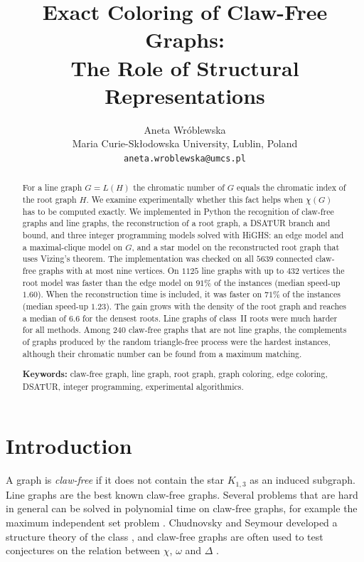 \documentclass[11pt,a4paper]{article}
\title{Exact Coloring of Claw-Free Graphs:\\ The Role of Structural Representations}
\author{Aneta Wróblewska\\[2pt]
\small Maria Curie-Sk\l{}odowska University, Lublin, Poland\\
\small \texttt{aneta.wroblewska@umcs.pl}}
\date{}
\begin{document}
\maketitle

\begin{abstract}
\noindent
For a line graph $G=L(H)$ the chromatic number of $G$ equals the chromatic
index of the root graph $H$. We examine experimentally whether this fact helps
when $\chi(G)$ has to be computed exactly. We implemented in Python the
recognition of claw-free graphs and line graphs, the reconstruction of a root
graph, a DSATUR branch and bound, and three integer programming models solved
with HiGHS: an edge model and a maximal-clique model on $G$, and a star model
on the reconstructed root graph that uses Vizing's theorem. The implementation
was checked on all $5639$ connected claw-free graphs with at most nine
vertices. On $1125$ line graphs with up to $432$ vertices the root model was
faster than the edge model on $91\%$ of the instances (median speed-up $1.60$).
When the reconstruction time is included, it was faster on $71\%$ of the
instances (median speed-up $1.23$). The gain grows with the density of the root
graph and reaches a median of $6.6$ for the densest roots. Line graphs of
class~II roots were much harder for all methods. Among $240$ claw-free graphs
that are not line graphs, the complements of graphs produced by the random
triangle-free process were the hardest instances, although their chromatic
number can be found from a maximum matching.

\medskip\noindent
\textbf{Keywords:} claw-free graph, line graph, root graph, graph coloring,
edge coloring, DSATUR, integer programming, experimental algorithmics.
\end{abstract}

\section{Introduction}

A graph is \emph{claw-free} if it does not contain the star $K_{1,3}$ as an
induced subgraph. Line graphs are the best known claw-free graphs. Several
problems that are hard in general can be solved in polynomial time on
claw-free graphs, for example the maximum independent set problem
\cite{faudree1997}. Chudnovsky and Seymour developed a structure theory of the
class \cite{chudnovsky2005}, and claw-free graphs are often used to test
conjectures on the relation between $\chi$, $\omega$ and $\Delta$
\cite{scott2020,cook2025}.
\end{document}
